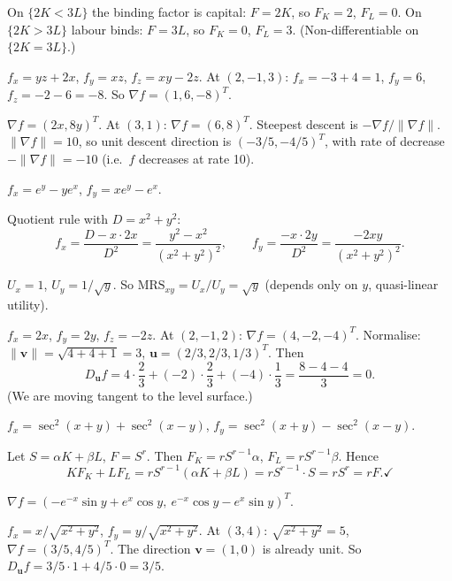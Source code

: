 \begin{solutions}
  \item On $\{2K<3L\}$ the binding factor is capital: $F=2K$, so
        $F_K=2$, $F_L=0$. On $\{2K>3L\}$ labour binds: $F=3L$, so
        $F_K=0$, $F_L=3$. (Non-differentiable on $\{2K=3L\}$.)

  \item $f_x=yz+2x$, $f_y=xz$, $f_z=xy-2z$. At $(2,-1,3)$:
        $f_x=-3+4=1$, $f_y=6$, $f_z=-2-6=-8$. So
        $\nabla f=(1,6,-8)^T$.

  \item $\nabla f=(2x,8y)^T$. At $(3,1)$: $\nabla f=(6,8)^T$. Steepest
        descent is $-\nabla f/\|\nabla f\|$. $\|\nabla f\|=10$, so unit
        descent direction is $(-3/5,-4/5)^T$, with rate of decrease
        $-\|\nabla f\|=-10$ (i.e.\ $f$ decreases at rate 10).

  \item $f_x=e^y-ye^x$, $f_y=xe^y-e^x$.

  \item Quotient rule with $D=x^2+y^2$:
        \[
          f_x=\frac{D-x\cdot2x}{D^2}=\frac{y^2-x^2}{(x^2+y^2)^2}, \qquad
          f_y=\frac{-x\cdot2y}{D^2}=\frac{-2xy}{(x^2+y^2)^2} .
        \]

  \item $U_x=1$, $U_y=1/\sqrt{y}$. So $\mathrm{MRS}_{xy}=U_x/U_y
        =\sqrt{y}$ (depends only on $y$, quasi-linear utility).

  \item $f_x=2x$, $f_y=2y$, $f_z=-2z$. At $(2,-1,2)$:
        $\nabla f=(4,-2,-4)^T$. Normalise: $\|\mathbf{v}\|=\sqrt{4+4+1}=3$,
        $\mathbf{u}=(2/3,2/3,1/3)^T$. Then
        \[
          D_{\mathbf{u}}f=4\cdot\frac23+(-2)\cdot\frac23+(-4)\cdot\frac13
            =\frac{8-4-4}{3}=0 .
        \]
        (We are moving tangent to the level surface.)

  \item $f_x=\sec^2(x+y)+\sec^2(x-y)$, $f_y=\sec^2(x+y)-\sec^2(x-y)$.

  \item Let $S=\alpha K+\beta L$, $F=S^r$. Then $F_K=rS^{r-1}\alpha$,
        $F_L=rS^{r-1}\beta$. Hence
        \[
          KF_K+LF_L=rS^{r-1}(\alpha K+\beta L)=rS^{r-1}\cdot S=rS^r=rF.
            \checkmark
        \]

  \item $\nabla f=(-e^{-x}\sin y+e^x\cos y,\ e^{-x}\cos y-e^x\sin y)^T$.

  \item $f_x=x/\sqrt{x^2+y^2}$, $f_y=y/\sqrt{x^2+y^2}$. At $(3,4)$:
        $\sqrt{x^2+y^2}=5$, $\nabla f=(3/5,4/5)^T$. The direction
        $\mathbf{v}=(1,0)$ is already unit. So
        $D_{\mathbf{u}}f=3/5\cdot1+4/5\cdot0=3/5$.


\end{solutions}
